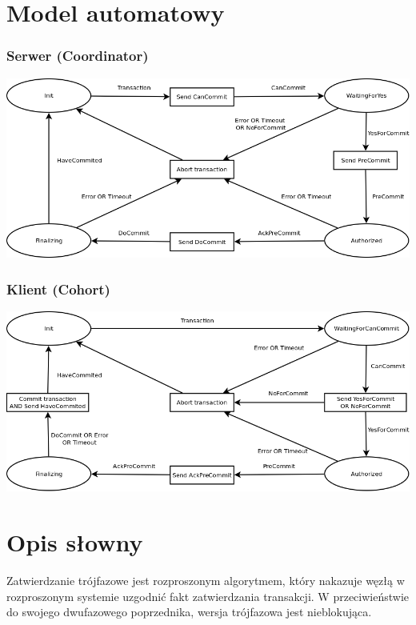 \documentclass[a4paper, oneside, 11pt]{report}
\begin{document}
\section{Model automatowy}
\subsubsection{Serwer (Coordinator)}
\includegraphics[width=15cm]{3PC-serwer.png}
\subsubsection{Klient (Cohort)}
\includegraphics[width=15cm]{3PC-klient.png}
\section{Opis słowny}
Zatwierdzanie trójfazowe jest rozproszonym algorytmem, który nakazuje węzłą w rozproszonym systemie uzgodnić fakt zatwierdzania transakcji. W przeciwieństwie do swojego dwufazowego poprzednika, wersja trójfazowa jest nieblokująca. 
\end{document}
